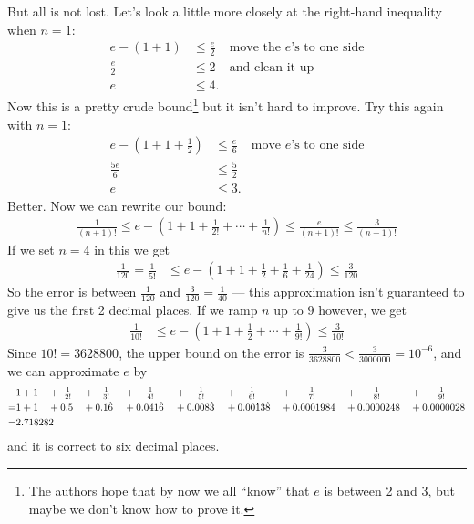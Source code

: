 \begin{eg}
But all is not lost. Let's look a little more closely at the right-hand inequality when $n=1$:
\begin{align*}
  e - (1+1) &\leq \frac{e}{2}& \text{move the $e$'s to one side}\\
  \frac{e}{2} & \leq 2 & \text{and clean it up}\\
  e & \leq 4.
\end{align*}
Now this is a pretty crude bound\footnote{The authors hope that by now we all ``know'' that $e$ is between 2 and 3,
but maybe we don't know how to prove it.} but it isn't hard to improve. Try this again with $n=1$:
\begin{align*}
  e - (1+1+\frac{1}{2}) & \leq \frac{e}{6} & \text{move $e$'s to one side}\\
  \frac{5e}{6} & \leq \frac{5}{2} \\
  e & \leq 3.
\end{align*}
Better. Now we can rewrite our bound:
\begin{align*}
\frac{1}{(n+1)!} \leq e - \left( 1+1+\tfrac{1}{2!}+\cdots+\tfrac{1}{n!} \right) \leq \frac{e}{(n+1)!} \leq
\frac{3}{(n+1)!}
\end{align*}
If we set $n=4$ in this we get
\begin{align*}
\frac{1}{120}=\frac{1}{5!} &\leq e - \left(1 + 1 + \frac{1}{2} + \frac{1}{6} + \frac{1}{24} \right) \leq \frac{3}{120}
\end{align*}
So the error is between $\frac{1}{120}$ and $\frac{3}{120}=\frac{1}{40}$ ---  this approximation isn't guaranteed
to give us the first 2 decimal places. If we ramp $n$ up to $9$ however, we get
\begin{align*}
\frac{1}{10!} &\leq e - \left(1 + 1 + \frac{1}{2} + \cdots + \frac{1}{9!} \right) \leq \frac{3}{10!}
\end{align*}
Since $10! = 3628800$, the upper bound on the error is $\frac{3}{3628800} < \frac{3}{3000000} = 10^{-6}$, and we
can approximate $e$ by
\begin{alignat*}{10}
&1+1 &
  &+\ \tfrac{1}{2!} &
  &+\ \ \tfrac{1}{3!}\ &
  &+\hskip10pt\tfrac{1}{4!}\hskip10pt &
  &+\hskip10pt\tfrac{1}{5!}\hskip10pt &
  &+\hskip10pt\tfrac{1}{6!}\hskip10pt &
  &+\hskip15pt\tfrac{1}{7!}\hskip15pt &
  &+\hskip15pt\tfrac{1}{8!}\hskip15pt &
  &+\hskip15pt\tfrac{1}{9!}
\\
 =&1+1&
 &+0.5&
 &+0.1\dot 6&
 &+0.041\dot 6&
 &+0.008\dot 3&
 &+0.0013\dot 8&
 &+0.0001984&
 &+0.0000248&
 &+0.0000028\\
=&2.718282\hidewidth
\end{alignat*}
and it is correct to six decimal places.
\end{eg}



